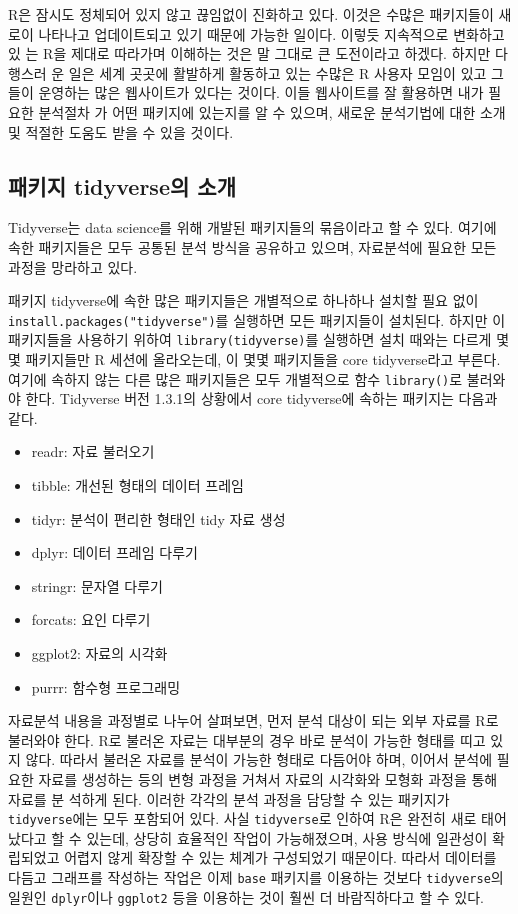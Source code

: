 \documentclass[
]{book}
\begin{document}
R은 잠시도 정체되어 있지 않고 끊임없이 진화하고 있다. 이것은 수많은
패키지들이 새 로이 나타나고 업데이트되고 있기 때문에 가능한 일이다.
이렇듯 지속적으로 변화하고 있 는 R을 제대로 따라가며 이해하는 것은 말
그대로 큰 도전이라고 하겠다. 하지만 다행스러 운 일은 세계 곳곳에
활발하게 활동하고 있는 수많은 R 사용자 모임이 있고 그들이 운영하는 많은
웹사이트가 있다는 것이다. 이들 웹사이트를 잘 활용하면 내가 필요한
분석절차 가 어떤 패키지에 있는지를 알 수 있으며, 새로운 분석기법에 대한
소개 및 적절한 도움도 받을 수 있을 것이다.

\hypertarget{uxd328uxd0a4uxc9c0-tidyverseuxc758-uxc18cuxac1c}{%
\subsection{패키지 tidyverse의 소개}\label{uxd328uxd0a4uxc9c0-tidyverseuxc758-uxc18cuxac1c}}

Tidyverse는 data science를 위해 개발된 패키지들의 묶음이라고 할 수 있다.
여기에 속한 패키지들은 모두 공통된 분석 방식을 공유하고 있으며,
자료분석에 필요한 모든 과정을 망라하고 있다.

패키지 tidyverse에 속한 많은 패키지들은 개별적으로 하나하나 설치할 필요
없이 \texttt{install.packages("tidyverse")}를 실행하면 모든 패키지들이
설치된다. 하지만 이 패키지들을 사용하기 위하여 \texttt{library(tidyverse)}를
실행하면 설치 때와는 다르게 몇몇 패키지들만 R 세션에 올라오는데, 이 몇몇
패키지들을 core tidyverse라고 부른다. 여기에 속하지 않는 다른 많은
패키지들은 모두 개별적으로 함수 \texttt{library()}로 불러와야 한다. Tidyverse
버전 1.3.1의 상황에서 core tidyverse에 속하는 패키지는 다음과 같다.

\begin{itemize}
\item
  readr: 자료 불러오기
\item
  tibble: 개선된 형태의 데이터 프레임
\item
  tidyr: 분석이 편리한 형태인 tidy 자료 생성
\item
  dplyr: 데이터 프레임 다루기
\item
  stringr: 문자열 다루기
\item
  forcats: 요인 다루기
\item
  ggplot2: 자료의 시각화
\item
  purrr: 함수형 프로그래밍
\end{itemize}

자료분석 내용을 과정별로 나누어 살펴보면, 먼저 분석 대상이 되는 외부
자료를 R로 불러와야 한다. R로 불러온 자료는 대부분의 경우 바로 분석이
가능한 형태를 띠고 있지 않다. 따라서 불러온 자료를 분석이 가능한 형태로
다듬어야 하며, 이어서 분석에 필요한 자료를 생성하는 등의 변형 과정을
거쳐서 자료의 시각화와 모형화 과정을 통해 자료를 분 석하게 된다. 이러한
각각의 분석 과정을 담당할 수 있는 패키지가 \texttt{tidyverse}에는 모두 포함되어
있다. 사실 \texttt{tidyverse}로 인하여 R은 완전히 새로 태어났다고 할 수 있는데,
상당히 효율적인 작업이 가능해졌으며, 사용 방식에 일관성이 확립되었고
어렵지 않게 확장할 수 있는 체계가 구성되었기 때문이다. 따라서 데이터를
다듬고 그래프를 작성하는 작업은 이제 \texttt{base} 패키지를 이용하는 것보다
\texttt{tidyverse}의 일원인 \texttt{dplyr}이나 \texttt{ggplot2} 등을 이용하는 것이 훨씬 더
바람직하다고 할 수 있다.
\end{document}
